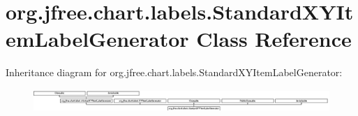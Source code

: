 \hypertarget{classorg_1_1jfree_1_1chart_1_1labels_1_1_standard_x_y_item_label_generator}{}\section{org.\+jfree.\+chart.\+labels.\+Standard\+X\+Y\+Item\+Label\+Generator Class Reference}
\label{classorg_1_1jfree_1_1chart_1_1labels_1_1_standard_x_y_item_label_generator}
Inheritance diagram for org.\+jfree.\+chart.\+labels.\+Standard\+X\+Y\+Item\+Label\+Generator\+:\begin{figure}[H]
\begin{center}
\leavevmode
\includegraphics[height=0.869565cm]{classorg_1_1jfree_1_1chart_1_1labels_1_1_standard_x_y_item_label_generator}
\end{center}
\end{figure}
